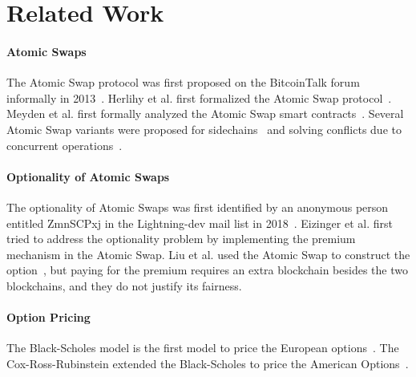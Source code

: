\section{Related Work}
\label{sec:related_work}

\paragraph{Atomic Swaps}
The Atomic Swap protocol was first proposed on the BitcoinTalk forum informally in 2013~\cite{nolan2013alt}.
Herlihy et al. first formalized the Atomic Swap protocol~\cite{herlihy2018atomic}.
Meyden et al. first formally analyzed the Atomic Swap smart contracts~\cite{van2018specification}.
Several Atomic Swap variants were proposed for sidechains~\cite{robinson2019atomic} and solving conflicts due to concurrent operations~\cite{zakhary2019atomic}.

\paragraph{Optionality of Atomic Swaps}
The optionality of Atomic Swaps was first identified by an anonymous person entitled ZmnSCPxj in the Lightning-dev mail list in 2018~\cite{optionality-origin}.
Eizinger et al. first tried to address the optionality problem by implementing the premium mechanism in the Atomic Swap\cite{first-attempt-optionality}.
Liu et al. used the Atomic Swap to construct the option~\cite{liu2018atomic}, but paying for the premium requires an extra blockchain besides the two blockchains, and they do not justify its fairness.

\paragraph{Option Pricing}
The Black-Scholes model is the first model to price the European options~\cite{black1973pricing}.
The Cox-Ross-Rubinstein extended the Black-Scholes to price the American Options~\cite{cox1979option}.